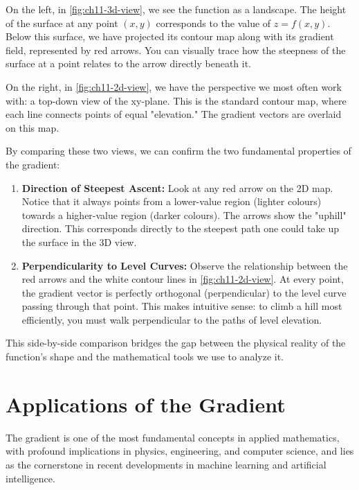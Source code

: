 On the left, in \autoref{fig:ch11-3d-view}, we see the function as a landscape. The height of the surface at any point \((x, y)\) corresponds to the value of \(z = f(x, y)\). Below this surface, we have projected its contour map along with its gradient field, represented by red arrows. You can visually trace how the steepness of the surface at a point relates to the arrow directly beneath it.

On the right, in \autoref{fig:ch11-2d-view}, we have the perspective we most often work with: a top-down view of the xy-plane. This is the standard contour map, where each line connects points of equal "elevation." The gradient vectors are overlaid on this map.

By comparing these two views, we can confirm the two fundamental properties of the gradient:

\begin{enumerate}
    \item \textbf{Direction of Steepest Ascent:} Look at any red arrow on the 2D map. Notice that it always points from a lower-value region (lighter colours) towards a higher-value region (darker colours). The arrows show the "uphill" direction. This corresponds directly to the steepest path one could take up the surface in the 3D view.
    
    \item \textbf{Perpendicularity to Level Curves:} Observe the relationship between the red arrows and the white contour lines in \autoref{fig:ch11-2d-view}. At every point, the gradient vector is perfectly orthogonal (perpendicular) to the level curve passing through that point. This makes intuitive sense: to climb a hill most efficiently, you must walk perpendicular to the paths of level elevation.
\end{enumerate}

This side-by-side comparison bridges the gap between the physical reality of the function's shape and the mathematical tools we use to analyze it.

\section{Applications of the Gradient}

The gradient is one of the most fundamental concepts in applied mathematics, with profound implications in physics, engineering, and computer science, and lies as the cornerstone in recent developments in machine learning and artificial intelligence.

